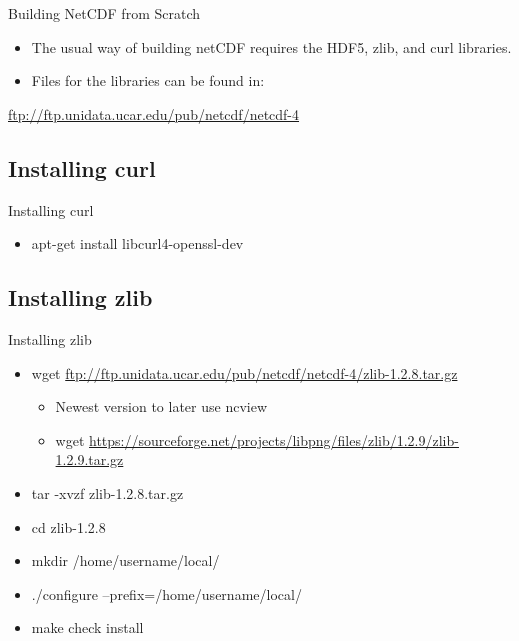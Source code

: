 \documentclass[compress,11pt,xcolor=svgnames,aspectratio=169]{beamer}
\begin{document}
\begin{frame}[fragile]{Building NetCDF from Scratch}

\begin{itemize}
\setlength\itemsep{0.8cm}

  \item The usual way of building netCDF requires the HDF5, zlib, and curl libraries.

  \item Files for the libraries can be found in:

\end{itemize}

\begin{center}
\url{ftp://ftp.unidata.ucar.edu/pub/netcdf/netcdf-4}
\end{center}

\end{frame}

\subsection{Installing curl}

\begin{frame}[fragile]{Installing curl}

\begin{itemize}

  \item apt-get install libcurl4-openssl-dev

\end{itemize}

\end{frame}

\subsection{Installing zlib}

\begin{frame}[fragile]{Installing zlib}

\begin{itemize}
\setlength\itemsep{0.3cm}

  \item wget \url{ftp://ftp.unidata.ucar.edu/pub/netcdf/netcdf-4/zlib-1.2.8.tar.gz}
  \begin{itemize}
    \item Newest version to later use ncview
    \item wget \url{https://sourceforge.net/projects/libpng/files/zlib/1.2.9/zlib-1.2.9.tar.gz}
  \end{itemize}
  \item tar -xvzf zlib-1.2.8.tar.gz
  \item cd zlib-1.2.8
  \item mkdir /home/username/local/
  \item ./configure --prefix=/home/username/local/
  \item make check install

\end{itemize}

\end{frame}
\end{document}
